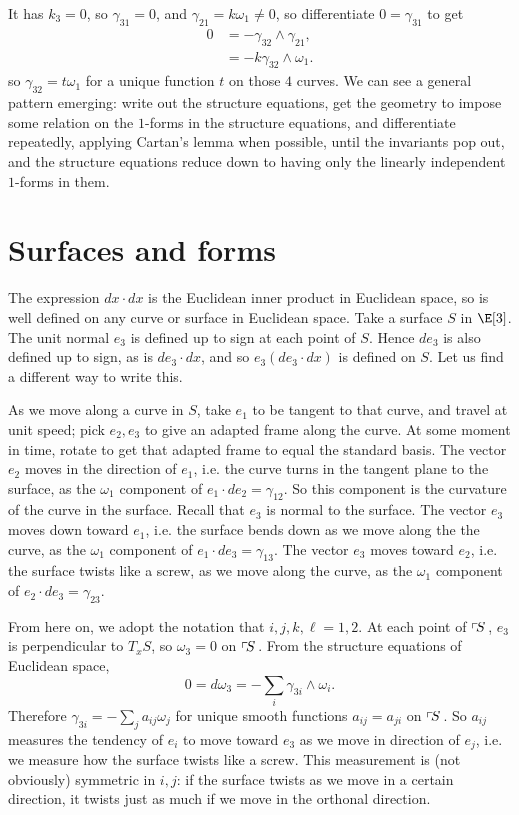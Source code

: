 It has \(k_3=0\), so \(\gamma_{31}=0\), and \(\gamma_{21}=k \omega_1 \ne 0\), so differentiate \(0=\gamma_{31}\) to get 
\begin{align*}
0&=
-\gamma_{32}\wedge\gamma_{21},
\\
&=
-k\gamma_{32}\wedge\omega_1.
\end{align*}
so \(\gamma_{32}=t\omega_1\) for a unique function \(t\) on those \(4\) curves.
We can see a general pattern emerging: write out the structure equations, get the geometry to impose some relation on the \(1\)-forms in the structure equations, and differentiate repeatedly, applying Cartan's lemma when possible, until the invariants pop out, and the structure equations reduce down to having only the linearly independent \(1\)-forms in them.

\section{Surfaces and forms}
The expression \(dx \cdot dx\) is the Euclidean inner product in Euclidean space, so is well defined on any curve or surface in Euclidean space.
Take a surface \(S\) in \(\E[3]\).
The unit normal \(e_3\) is defined up to sign at each point of \(S\).
Hence \(de_3\) is also defined up to sign, as is \(de_3 \cdot dx\), and so \(e_3 (de_3 \cdot dx)\) is defined on \(S\).
Let us find a different way to write this.

As we move along  a curve in \(S\), take \(e_1\) to be tangent to that curve, and travel at unit speed; pick \(e_2,e_3\) to give an adapted frame along the curve.
At some moment in time, rotate to get that adapted frame to equal the standard basis.
The vector \(e_2\) moves in the direction of \(e_1\), i.e. the curve turns in the tangent plane to the surface, as the \(\omega_1\) component of \(e_1 \cdot de_2=\gamma_{12}\).
So this component is the curvature of the curve in the surface.
Recall that \(e_3\) is normal to the surface.
The vector \(e_3\) moves down toward \(e_1\), i.e. the surface bends down as we move along the the curve, as the \(\omega_1\) component of \(e_1 \cdot de_3=\gamma_{13}\).
The vector \(e_3\) moves toward \(e_2\), i.e. the surface twists like a screw, as we move along the curve, as the \(\omega_1\) component of \(e_2 \cdot de_3=\gamma_{23}\).

From here on, we adopt the notation that \(i,j,k,\ell=1,2\).
At each point of \(\left\ulcorner\!S\right.\), \(e_3\) is perpendicular to \(T_x S\), so \(\omega_3=0\) on \(\left\ulcorner\!S\right.\).
From the structure equations of Euclidean space,
\[ 
0=d\omega_3=-\sum_i \gamma_{3 i} \wedge \omega_i.
\]
Therefore \(\gamma_{3i}=-\sum_j a_{ij} \omega_j\) for unique smooth functions \(a_{ij}=a_{ji}\) on \(\left\ulcorner\!S\right.\).
So \(a_{ij}\) measures the tendency of \(e_i\) to move toward \(e_3\) as we move in direction of \(e_j\), i.e. we measure how the surface twists like a screw.
This measurement is (not obviously) symmetric in \(i,j\): if the surface twists as we move in a certain direction, it twists just as much if we move in the orthonal direction.

